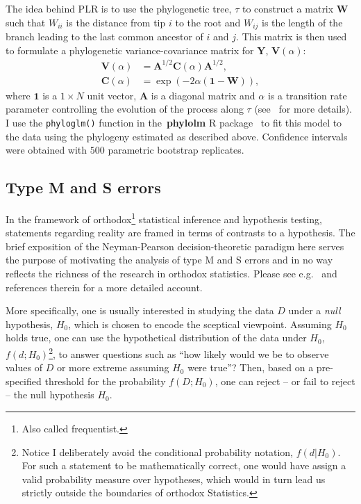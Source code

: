 The idea behind PLR is to use the phylogenetic tree, $\tau$ to construct a matrix $\boldsymbol W$ such that $W_{ii}$ is the distance from tip $i$ to the root and $W_{ij}$ is the length of the branch leading to the last common ancestor of $i$ and $j$.
This matrix is then used to formulate a phylogenetic variance-covariance matrix for $\boldsymbol Y$, $\boldsymbol V(\alpha)$:
\begin{align}
 \boldsymbol V(\alpha) &= \boldsymbol A^{1/2}  \boldsymbol C(\alpha)  \boldsymbol A^{1/2}, \\
  \boldsymbol C(\alpha) &= \exp\left(-2\alpha\left( \boldsymbol 1 - \boldsymbol W \right) \right), 
\end{align}
where $\boldsymbol 1$ is a $1 \times N$ unit vector, $\boldsymbol A$ is a diagonal matrix and $\alpha$ is a transition rate parameter controlling the evolution of the process along $\tau$ (see~\cite{Ives2009} for more details).
I use the \verb|phyloglm()| function in the~\textbf{phylolm} R package~\citep{Lam2014} to fit this model to the data using the phylogeny estimated as described above.
Confidence intervals were obtained with $500$ parametric bootstrap replicates.
 
\subsection{Type M and S errors}
\label{sec:MSerror}

In the framework of orthodox\footnote{Also called frequentist.} statistical inference and hypothesis testing, statements regarding reality are framed in terms of contrasts to a hypothesis.
The brief exposition of the Neyman-Pearson decision-theoretic paradigm here serves the purpose of motivating the analysis of type M and S errors and in no way reflects the richness of the research in orthodox statistics.
Please see e.g.~\cite{Casella2002} and references therein for a more detailed account.

More specifically, one is usually interested in studying the data $D$ under a \textit{null} hypothesis, $H_0$, which is chosen to encode the sceptical viewpoint.
Assuming $H_0$ holds true, one can use the hypothetical distribution of the data under $H_0$, $f(d; H_0)$\footnote{Notice I deliberately avoid the conditional probability notation, $f(d|H_0)$. For such a statement to be mathematically correct, one would have assign a valid probability measure over hypotheses, which would in turn lead us strictly outside the boundaries of orthodox Statistics.}, to answer questions such as ``how likely would we be to observe values of $D$ or more extreme assuming $H_0$ were true''?
Then, based on a pre-specified threshold for the probability $f(D; H_0)$, one can reject -- or fail to reject --  the null hypothesis $H_0$.

